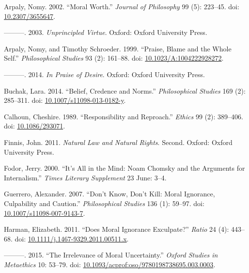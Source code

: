 \documentclass[
  11pt,
  letterpaper,
  DIV=11,
  numbers=noendperiod,
  twoside]{scrartcl}
\newlength{\cslhangindent}
\newenvironment{CSLReferences}[2] %
 {\begin{list}{}{%
  \setlength{\itemindent}{0pt}
  \setlength{\leftmargin}{0pt}
  \setlength{\parsep}{0pt}
  \ifodd #1
   \setlength{\leftmargin}{\cslhangindent}
   \setlength{\itemindent}{-1\cslhangindent}
  \fi
  \setlength{\itemsep}{#2\baselineskip}}}
 {\end{list}}
\begin{document}
\label{refs}
\begin{CSLReferences}{1}{0}
Arpaly, Nomy. 2002. {``Moral Worth.''} \emph{Journal of Philosophy} 99
(5): 223--45. doi:
\href{https://doi.org/10.2307/3655647}{10.2307/3655647}.

---------. 2003. \emph{Unprincipled Virtue}. Oxford: Oxford University
Press.

Arpaly, Nomy, and Timothy Schroeder. 1999. {``Praise, Blame and the
Whole Self.''} \emph{Philosophical Studies} 93 (2): 161--88. doi:
\href{https://doi.org/10.1023/A:1004222928272}{10.1023/A:1004222928272}.

---------. 2014. \emph{In Praise of Desire}. Oxford: Oxford University
Press.

Buchak, Lara. 2014. {``Belief, Credence and Norms.''}
\emph{Philosophical Studies} 169 (2): 285--311. doi:
\href{https://doi.org/10.1007/s11098-013-0182-y}{10.1007/s11098-013-0182-y}.

Calhoun, Cheshire. 1989. {``Responsibility and Reproach.''}
\emph{Ethics} 99 (2): 389--406. doi:
\href{https://doi.org/10.1086/293071}{10.1086/293071}.

Finnis, John. 2011. \emph{Natural Law and Natural Rights}. Second.
Oxford: Oxford University Press.

Fodor, Jerry. 2000. {``It's All in the Mind: Noam Chomsky and the
Arguments for Internalism.''} \emph{Times Literary Supplement} 23 June:
3--4.

Guerrero, Alexander. 2007. {``Don't Know, Don't Kill: Moral Ignorance,
Culpability and Caution.''} \emph{Philosophical Studies} 136 (1):
59--97. doi:
\href{https://doi.org/10.1007/s11098-007-9143-7}{10.1007/s11098-007-9143-7}.

Harman, Elizabeth. 2011. {``Does Moral Ignorance Exculpate?''}
\emph{Ratio} 24 (4): 443--68. doi:
\href{https://doi.org/10.1111/j.1467-9329.2011.00511.x}{10.1111/j.1467-9329.2011.00511.x}.

---------. 2015. {``The Irrelevance of Moral Uncertainty.''}
\emph{Oxford Studies in Metaethics} 10: 53--79. doi:
\href{https://doi.org/10.1093/acprof:oso/9780198738695.003.0003}{10.1093/acprof:oso/9780198738695.003.0003}.


\end{CSLReferences}
\end{document}
